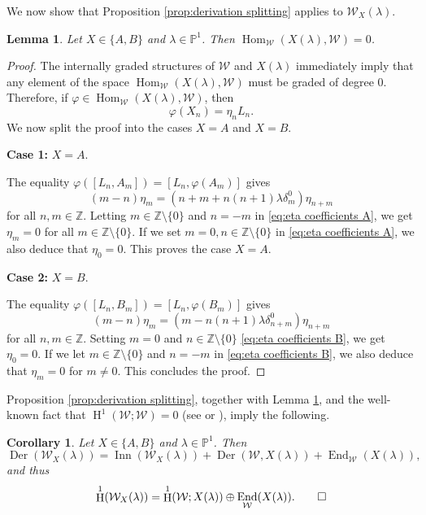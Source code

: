 \documentclass[11pt, svgnames]{amsart}
\DeclareMathOperator{\End}{End}
\DeclareMathOperator{\Hom}{Hom}
\newcommand{\ZZ}{\mathbb{Z}}
\newcommand{\PP}{\mathbb{P}}
\newcommand{\W}{\mathcal{W}}
\DeclareMathOperator{\Der}{Der}
\DeclareMathOperator{\Inn}{Inn}
\DeclareMathOperator{\HH}{H}
\newcommand{\nonzero}{\setminus \{0\}}
\newcommand{\case}[2]{\vspace{2mm} \textbf{Case #1:} #2 \vspace{2mm}}
\newtheorem{lemma}[proposition]{Lemma}
\newtheorem{corollary}[proposition]{Corollary}
\theoremstyle{definition}
\begin{document}
We now show that Proposition \ref{prop:derivation splitting} applies to $\W_X(\lambda)$.

\begin{lemma}\label{lem:no homs X to W}
    Let $X \in \{A,B\}$ and $\lambda \in \PP^1$. Then $\Hom_\W(X(\lambda),\W) = 0$.
\end{lemma}
\begin{proof}
    The internally graded structures of $\W$ and $X(\lambda)$ immediately imply that any element of the space $\Hom_\W(X(\lambda),\W)$ must be graded of degree 0. Therefore, if $\varphi \in \Hom_\W(X(\lambda),\W)$, then
    $$\varphi(X_n) = \eta_n L_n.$$
    We now split the proof into the cases $X = A$ and $X = B$.

    \case{1}{$X = A$.}

    The equality $\varphi([L_n,A_m]) = [L_n,\varphi(A_m)]$ gives
    \begin{equation}\label{eq:eta coefficients A}
        (m - n)\eta_m = (n + m + n(n + 1) \lambda \delta_m^0)\eta_{n+m}
    \end{equation}
    for all $n,m \in \ZZ$. Letting $m \in \ZZ \nonzero$ and $n = -m$ in \eqref{eq:eta coefficients A}, we get $\eta_m = 0$ for all $m \in \ZZ \nonzero$. If we set $m = 0, n \in \ZZ \nonzero$ in \eqref{eq:eta coefficients A}, we also deduce that $\eta_0 = 0$. This proves the case $X = A$.

    \case{2}{$X = B$.}

    The equality $\varphi([L_n,B_m]) = [L_n,\varphi(B_m)]$ gives
    \begin{equation}\label{eq:eta coefficients B}
        (m - n)\eta_m = (m - n(n + 1)\lambda \delta_{n+m}^0)\eta_{n+m}
    \end{equation}
    for all $n,m \in \ZZ$. Setting $m = 0$ and $n \in \ZZ \nonzero$ \eqref{eq:eta coefficients B}, we get $\eta_0 = 0$. If we let $m \in \ZZ \nonzero$ and $n = -m$ in \eqref{eq:eta coefficients B}, we also deduce that $\eta_m = 0$ for $m \neq 0$. This concludes the proof.
\end{proof}

Proposition \ref{prop:derivation splitting}, together with Lemma \ref{lem:no homs X to W}, and the well-known fact that $\HH^1(\W;\W) = 0$ (see \cite[Proposition 7.2]{Buzaglo} or \cite{IkedaKawamoto}), imply the following.

\begin{corollary}\label{cor:derivations of WX split}
    Let $X \in \{A,B\}$ and $\lambda \in \PP^1$. Then
    $$\Der(\W_X(\lambda)) = \Inn(\W_X(\lambda)) + \Der(\W,X(\lambda)) + \End_\W(X(\lambda)),$$
    and thus
    $$\HH^1(\W_X(\lambda)) = \HH^1(\W;X(\lambda)) \oplus \End_\W(X(\lambda)).\qed$$
\end{corollary}
\end{document}
